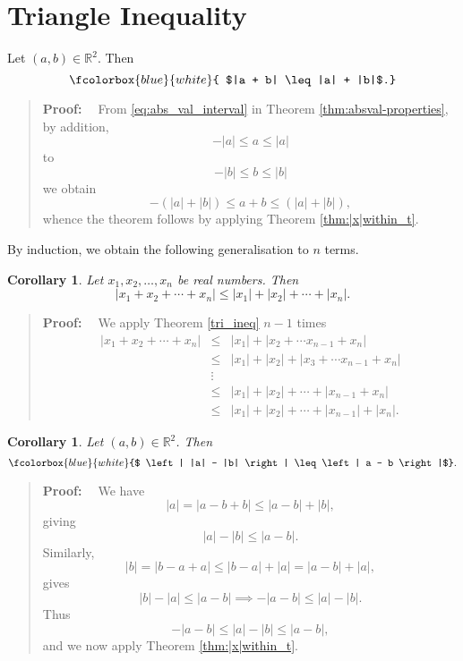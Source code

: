 \documentclass[11pt, openany]{book}
\theoremstyle{change} \theoremheaderfont{\blue\sffamily\bfseries}
\newtheorem{cor}[thm]{Corollary}
\newcommand{\proofsymbol}{\Pisymbol{pzd}{113}}
\theoremstyle{nonumberplain} \theoremheaderfont{\sffamily\bfseries}
\newenvironment{pf}[0]{\itshape\begin{quote}{\bf Proof: \ }}{\proofsymbol\end{quote}}
\newcommand{\BBR}{\mathbb{R}}
\def\absval#1{\left| #1 \right|}
\newcommand{\í}{\'{\i}}
\begin{document}
\section{Triangle Inequality}
\begin{thm} Let $(a, b)\in \BBR^2$. Then
\begin{equation}\fcolorbox{blue}{white}{ $|a + b| \leq |a| + |b|$.}\end{equation}
\label{tri_ineq}
\end{thm}
\begin{pf}
From \ref{eq:abs_val_interval} in Theorem
\ref{thm:absval-properties}, by addition,
$$-|a| \leq a \leq |a| $$to$$-|b| \leq b \leq |b| $$we obtain
$$-(|a| + |b| ) \leq a + b \leq (|a| + |b|),$$whence the theorem follows by applying Theorem \ref{thm:|x|within_t}.
\end{pf}
By induction, we obtain the following generalisation to $n$ terms.
\begin{cor}\label{cor:triangle-ineq}
Let $x_1, x_2, \ldots , x_n$ be real numbers. Then $$ \absval{x_1 +
x_2 + \cdots + x_n}\leq \absval{x_1}+\absval{x_2}+\cdots +
\absval{x_n}.
$$
\end{cor}
\begin{pf}
We apply Theorem \ref{tri_ineq} $n-1$ times
$$ \begin{array}{lll} \absval{x_1 +
x_2 + \cdots + x_n}& \leq & \absval{x_1} +\absval{ x_2 + \cdots
x_{n-1}+ x_n}\\
& \leq & \absval{x_1} +\absval{x_2} +\absval{ x_3 + \cdots
x_{n-1}+ x_n}\\
& \vdots & \\
& \leq & \absval{x_1}+\absval{x_2}+\cdots + \absval{x_{n-1}+x_n}\\ &
\leq & \absval{x_1}+\absval{x_2}+\cdots +
\absval{x_{n-1}}+\absval{x_n}.
\end{array}$$


\end{pf}
\begin{cor}
 Let $(a, b)\in \BBR^2$. Then
\begin{equation} \fcolorbox{blue}{white}{$ \absval{|a| - |b|}  \leq \absval{a - b}$}.\end{equation}
\label{tri_ineq_2}
\end{cor}
\begin{pf}
We have $$|a| = |a - b + b| \leq |a - b| + |b|,$$giving
$$|a| - |b| \leq |a - b|.$$Similarly,
$$|b| = |b - a + a| \leq |b - a| + |a| = |a - b| + |a|,$$gives
$$|b| - |a| \leq |a - b|\implies -\absval{a-b} \leq \absval{a}-\absval{b}.$$Thus
$$-\absval{a-b} \leq \absval{a}-\absval{b}  \leq  \absval{a-b},  $$
and we now apply Theorem \ref{thm:|x|within_t}.
\end{pf}
\end{document}
